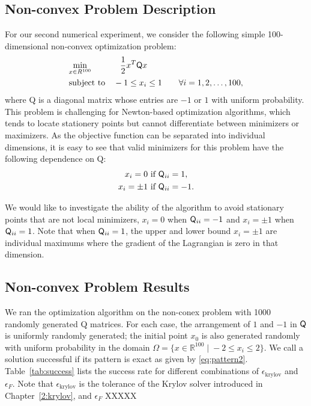 \subsection{Non-convex Problem Description}
For our second numerical experiment, we consider the following simple 100-dimensional non-convex optimization problem:
\begin{equation*}
\begin{aligned}
&\underset{x \in R^{100}} {\text{min}}  
& &\phantom{-} \frac{1}{2}x^T \mathsf{Q} x \\
  & {\text{subject to}}
& &-1 \leq x_i \leq 1 \qquad \forall i = 1,2,\ldots,100, \\
\end{aligned}
\end{equation*}
where Q is a diagonal matrix whose entries are $-1$ or $1$ with uniform probability.
This problem is challenging for Newton-based optimization algorithms, which 
tends to locate stationery points  but cannot differentiate between 
minimizers or maximizers. As the objective function can be separated into 
individual dimensions, it is easy to see that 
valid minimizers for this problem have the following dependence on Q:
\begin{equation}\label{eq:pattern2}
  \begin{gathered}
  x_i=0  \text{~if~}  \mathsf{Q}_{ii} = 1,  \\
  x_i = \pm 1  \text{~if~}  \mathsf{Q}_{ii} = -1.
  \end{gathered}
\end{equation}

We would like to investigate
the ability of the algorithm to avoid stationary points that are not local minimizers, 
\eg $x_i = 0$ 
when $\mathsf{Q}_{ii} = -1$ and $x_i = \pm 1$ when $\mathsf{Q}_{ii} = 1$.
Note that when $\mathsf{Q}_{ii} = 1$, the upper and lower bound $x_i = \pm 1$ are 
individual maximums where the gradient of the Lagrangian is zero in that dimension. 

\subsection{Non-convex Problem Results}
We ran the optimization algorithm on the non-conex problem with 1000 randomly generated Q matrices.
For each case, 
the arrangement of $1$ and $-1$ in $\mathsf{Q}$ is uniformly randomly generated; 
 the initial point $x_0$ is also generated randomly with uniform probability in the domain
  $\Omega = \{ x \in \mathbb{R}^{100} \; | \; -2 \leq x_i \leq 2 \}$.  We call a solution successful if 
  its pattern is exact as given by \eqref{eq:pattern2}.  Table~\ref{tab:success} lists the success rate for different 
  combinations of $\epsilon_{\text{krylov}}$ and $\epsilon_F$. 
Note that $\epsilon_{\text{krylov}}$ is the tolerance of the Krylov solver introduced in Chapter~\ref{2:krylov}, 
and $\epsilon_F$ XXXXX
 

